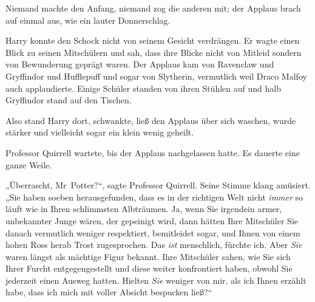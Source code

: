 Niemand machte den Anfang, niemand zog die anderen mit; der Applaus brach auf einmal aus, wie ein lauter Donnerschlag.

Harry konnte den Schock nicht von seinem Gesicht verdrängen. Er wagte einen Blick zu seinen Mitschülern und sah, dass ihre Blicke nicht von Mitleid sondern von Bewunderung geprägt waren. Der Applaus kam von Ravenclaw und Gryffindor und Hufflepuff und sogar von Slytherin, vermutlich weil Draco Malfoy auch applaudierte. Einige Schüler standen von ihren Stühlen auf und halb Gryffindor stand auf den Tischen.

Also stand Harry dort, schwankte, ließ den Applaus über sich waschen, wurde stärker und vielleicht sogar ein klein wenig geheilt.

Professor Quirrell wartete, bis der Applaus nachgelassen hatte. Es dauerte eine ganze Weile.

„Überrascht, Mr~Potter?“, sagte Professor Quirrell. Seine Stimme klang amüsiert. „Sie haben soeben herausgefunden, dass es in der richtigen Welt nicht \emph{immer} so läuft wie in Ihren schlimmsten Albträumen. Ja, wenn Sie irgendein armer, unbekannter Junge wären, der gepeinigt wird, dann hätten Ihre Mitschüler Sie danach vermutlich weniger respektiert, bemitleidet sogar, und Ihnen von einem hohen Ross herab Trost zugesprochen. Das \emph{ist} menschlich, fürchte ich. Aber \emph{Sie} waren längst als mächtige Figur bekannt. Ihre Mitschüler sahen, wie Sie sich Ihrer Furcht entgegengestellt und diese weiter konfrontiert haben, obwohl Sie jederzeit einen Ausweg hatten. Hielten \emph{Sie} weniger von mir, als ich Ihnen erzählt habe, dass ich mich mit voller Absicht bespucken ließ?“

